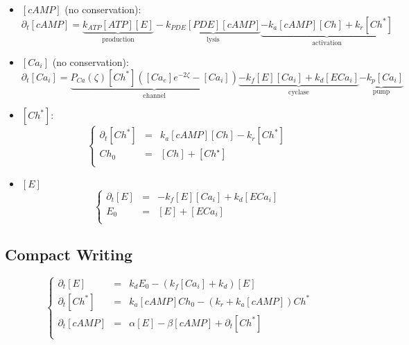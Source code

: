 \documentclass[aps,12pt]{revtex4}
\begin{document}
\begin{itemize}
\item $[cAMP]$ (no conservation):
	\begin{equation}
	\partial_t [cAMP] = \underbrace{k_{ATP} [ATP] [E]}_{\text{production}} 
	- \underbrace{k_{PDE} [PDE] [cAMP]}_{\text{lysis}}
	\underbrace{-k_a [cAMP][Ch] + k_r [Ch^\ast]}_{\text{activation}}
	\end{equation}
	
\item $[Ca_i]$ (no conservation):
	\begin{equation}
		\partial_t [Ca_i] = 
		\underbrace{P_{Ca}(\zeta) [Ch^\ast] ([Ca_e]e^{-2\zeta}-[Ca_i])}_{\text{channel}}
		\underbrace{ - k_f [E] [Ca_i]  + k_d [ECa_i] }_{\text{cyclase}}
		\underbrace{-k_p [Ca_i]}_{\text{pump}}
	\end{equation}
	
\item $[Ch^\ast]$:
	\begin{equation}
	\left\lbrace
	\begin{array}{rcl}
		\partial_t[Ch^\ast] &= &k_a [cAMP][Ch] - k_r [Ch^\ast]\\
	 		Ch_0 & = & [Ch] + [Ch^\star]\\
	\end{array}
	\right.
	\end{equation}
	
\item $[E]$
	\begin{equation}
	\left\lbrace
	\begin{array}{rcl}
		\partial_t [E] & = & - k_f [E] [Ca_i]  + k_d [ECa_i]\\
		E_0 & = & [E] + [ECa_i]\\
	\end{array}
	\right.
	\end{equation}
\end{itemize}

\subsection{Compact Writing}

\begin{equation}
\left\lbrace
\begin{array}{lcl}
\partial_t [E] & = & k_d E_0 - (k_f[Ca_i]+k_d)[E]\\
\partial_t [Ch^\ast] & = & k_a [cAMP] Ch_0 - (k_r+k_a[cAMP]) Ch^\ast\\
\partial_t [cAMP]    & = & \alpha [E] - \beta [cAMP] + \partial_t [Ch^\ast] \\
\end{array}
\right.
\end{equation}
\end{document}
